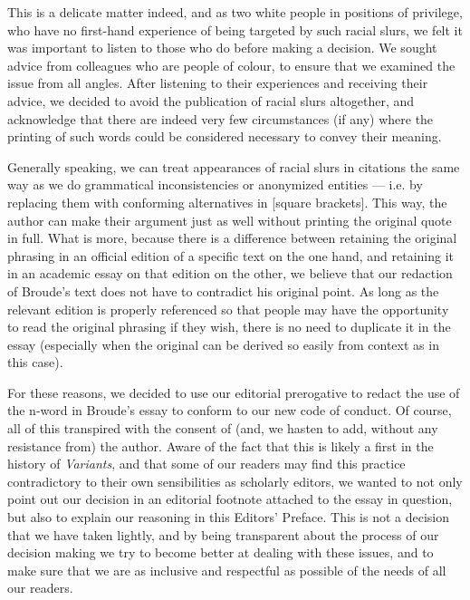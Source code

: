 \begin{preface}
This is a delicate matter indeed, and as two white people in positions of privilege, who have no first-hand experience of being targeted by such racial slurs, we felt it was important to listen to those who do before making a decision. We sought advice from colleagues who are people of colour, to ensure that we examined the issue from all angles. After listening to their experiences and receiving their advice, we decided to avoid the publication of racial slurs altogether, and acknowledge that there are indeed very few circumstances (if any) where the printing of such words could be considered necessary to convey their meaning. 

Generally speaking, we can treat appearances of racial slurs in citations the same way as we do grammatical inconsistencies or anonymized entities --- i.e. by replacing them with conforming alternatives in [square brackets].
This way, the author can make their argument just as well without printing the original quote in full. 
What is more, because there is a difference between retaining the original phrasing in an official edition of a specific text on the one hand, and retaining it in an academic essay on that edition on the other, we believe that our redaction of Broude's text does not have to contradict his original point. 
As long as the relevant edition is properly referenced so that people may have the opportunity to read the original phrasing if they wish, there is no need to duplicate it in the essay (especially when the original can be derived so easily from context as in this case). 

For these reasons, we decided to use our editorial prerogative to redact the use of the n-word in Broude's essay to conform to our new code of conduct. 
Of course, all of this transpired with the consent of (and, we hasten to add, without any resistance from) the author.
Aware of the fact that this is likely a first in the history of \emph{Variants}, and that some of our readers may find  this practice contradictory to their own sensibilities as scholarly editors, we wanted to not only point out our decision in an editorial footnote attached to the essay in question, but also to explain our reasoning in this Editors' Preface. 
This is not a decision that we have taken lightly, and by being transparent about the process of our decision making we try to become better at dealing with these issues, and to make sure that we are as inclusive and respectful as possible of the needs of all our readers.
\label{nword:preface:stop}


\end{preface}

